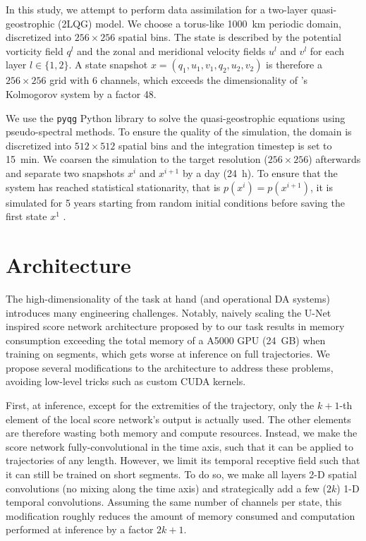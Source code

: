 In this study, we attempt to perform data assimilation for a two-layer quasi-geostrophic (2LQG) model. We choose a torus-like \qty{1000}{\kilo\meter} periodic domain, discretized into $256 \times 256$ spatial bins. The state is described by the potential vorticity field $q^l$ and the zonal and meridional velocity fields $u^l$ and $v^l$ for each layer $l \in \{1, 2\}$. A state snapshot $x = (q_1, u_1, v_1, q_2, u_2, v_2)$ is therefore a $256 \times 256$ grid with 6 channels, which exceeds the dimensionality of \textcite{rozet2023scorebased}'s Kolmogorov system by a factor 48.

We use the \texttt{pyqg} \cite{abernathey2022pyqg} Python library to solve the quasi-geostrophic equations using pseudo-spectral methods. To ensure the quality of the simulation, the domain is discretized into $512 \times 512$ spatial bins and the integration timestep is set to \qty{15}{min}. We coarsen the simulation to the target resolution ($256 \times 256$) afterwards and separate two snapshots $x^i$ and $x^{i + 1}$ by a day (\qty{24}{h}). To ensure that the system has reached statistical stationarity, that is $p(x^i) = p(x^{i+1})$, it is simulated for 5 years starting from random initial conditions before saving the first state $x^1$ \cite{bolton2019applications, ross2023benchmarking, mangeleer2023ocean}.

\section{Architecture} \label{sec:2lqg-architecture}

The high-dimensionality of the task at hand (and operational DA systems) introduces many engineering challenges. Notably, naively scaling the U-Net \cite{ronneberger2015unet} inspired score network architecture proposed by \textcite{rozet2023scorebased} to our task results in memory consumption exceeding the total memory of a A5000 GPU (\qty{24}{\giga B}) when training on segments, which gets worse at inference on full trajectories. We propose several modifications to the architecture to address these problems, avoiding low-level tricks such as custom CUDA kernels.

First, at inference, except for the extremities of the trajectory, only the $k + 1$-th element of the local score network's output is actually used. The other elements are therefore wasting both memory and compute resources. Instead, we make the score network fully-convolutional in the time axis, such that it can be applied to trajectories of any length. However, we limit its temporal receptive field such that it can still be trained on short segments. To do so, we make all layers 2-D spatial convolutions (no mixing along the time axis) and strategically add a few ($2k$) 1-D temporal convolutions. Assuming the same number of channels per state, this modification roughly reduces the amount of memory consumed and computation performed at inference by a factor $2k + 1$.

